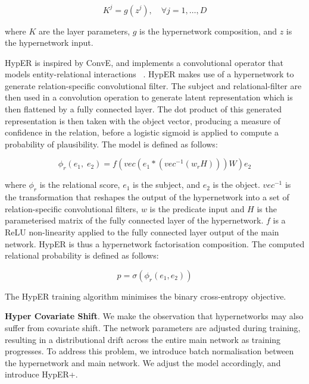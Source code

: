 \begin{equation}
	K^j = g(z^j), \quad \forall j = 1, \dots, D
\end{equation}

where $K$ are the layer parameters, $g$ is the hypernetwork composition, and $z$ is the hypernetwork input. \bigskip

HypER is inspired by ConvE, and implements a convolutional operator that models entity-relational interactions ~\citep{balazevic2019hypernetwork}. HypER makes use of a hypernetwork to generate relation-specific convolutional filter. The subject and relational-filter are then used in a convolution operation to generate latent representation which is then flattened by a fully connected layer. The dot product of this generated representation is then taken with the object vector, producing a measure of confidence in the relation, before a logistic sigmoid is applied to compute a probability of plausibility. The model is defined as follows: 

\begin{equation}
	\phi_r(e_1, \; e_2) = f(vec(e_1 * (vec^{-1}(w_rH)))W)e_2
\end{equation}

where $\phi_r$ is the relational score, $e_1$ is the subject, and $e_2$ is the object. $vec^{-1}$ is the transformation that reshapes the output of the hypernetwork into a set of relation-specific convolutional filters, $w$ is the predicate input and $H$ is the parameterised matrix of the fully connected layer of the hypernetwork. $f$ is a ReLU non-linearity applied to the fully connected layer output of the main network. HypER is thus a hypernetwork factorisation composition. The computed relational probability is defined as follows: 

\begin{equation}
	p = \sigma(\phi_r(e_1,e_2)) 
\end{equation}

The HypER training algorithm minimises the binary cross-entropy objective. \newpage

\textbf{Hyper Covariate Shift}. We make the observation that hypernetworks may also suffer from covariate shift. The network parameters are adjusted during training, resulting in a distributional drift across the entire main network as training progresses. To address this problem, we introduce batch normalisation between the hypernetwork and main network. We adjust the model accordingly, and introduce HypER+. \bigskip 

